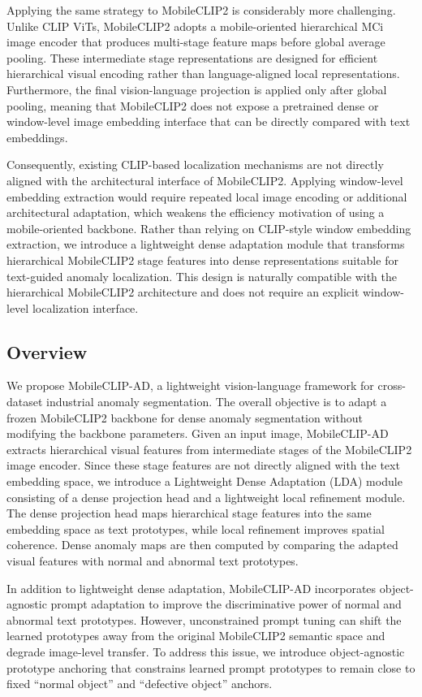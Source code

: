 \documentclass[10pt]{article}
\begin{document}
Applying the same strategy to MobileCLIP2 is considerably more challenging. Unlike CLIP ViTs, MobileCLIP2 adopts a mobile-oriented hierarchical MCi image encoder that produces multi-stage feature maps before global average pooling. These intermediate stage representations are designed for efficient hierarchical visual encoding rather than language-aligned local representations. Furthermore, the final vision-language projection is applied only after global pooling, meaning that MobileCLIP2 does not expose a pretrained dense or window-level image embedding interface that can be directly compared with text embeddings.

Consequently, existing CLIP-based localization mechanisms are not directly aligned with the architectural interface of MobileCLIP2. Applying window-level embedding extraction would require repeated local image encoding or additional architectural adaptation, which weakens the efficiency motivation of using a mobile-oriented backbone. Rather than relying on CLIP-style window embedding extraction, we introduce a lightweight dense adaptation module that transforms hierarchical MobileCLIP2 stage features into dense representations suitable for text-guided anomaly localization. This design is naturally compatible with the hierarchical MobileCLIP2 architecture and does not require an explicit window-level localization interface.

\subsection{Overview}

We propose MobileCLIP-AD, a lightweight vision-language framework for cross-dataset industrial anomaly segmentation. The overall objective is to adapt a frozen MobileCLIP2 backbone for dense anomaly segmentation without modifying the backbone parameters. Given an input image, MobileCLIP-AD extracts hierarchical visual features from intermediate stages of the MobileCLIP2 image encoder. Since these stage features are not directly aligned with the text embedding space, we introduce a Lightweight Dense Adaptation (LDA) module consisting of a dense projection head and a lightweight local refinement module. The dense projection head maps hierarchical stage features into the same embedding space as text prototypes, while local refinement improves spatial coherence. Dense anomaly maps are then computed by comparing the adapted visual features with normal and abnormal text prototypes.

In addition to lightweight dense adaptation, MobileCLIP-AD incorporates object-agnostic prompt adaptation to improve the discriminative power of normal and abnormal text prototypes. However, unconstrained prompt tuning can shift the learned prototypes away from the original MobileCLIP2 semantic space and degrade image-level transfer. To address this issue, we introduce object-agnostic prototype anchoring that constrains learned prompt prototypes to remain close to fixed ``normal object'' and ``defective object'' anchors.
\end{document}
